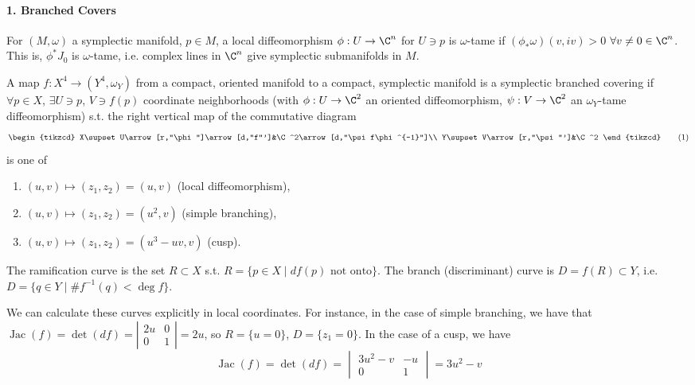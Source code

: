 \paragraph{1. Branched Covers}
\begin{definition}[1]
For $(M,\omega)$ a symplectic manifold, $p\in M$, a local diffeomorphism $\phi:U\to\C^n$ for $U\ni p$ is $\omega$-tame if $(\phi_*\omega)(v,iv)>0$ $\forall v\ne0\in\C^n$. This is, $\phi^*J_0$ is $\omega$-tame, i.e. complex lines in $\C^n$ give symplectic submanifolds in $M$.
\end{definition}
\begin{definition}[2]
A map $f:X^4\to(Y^4,\omega_Y)$ from a compact, oriented manifold to a compact, symplectic manifold is a symplectic branched covering if $\forall p\in X$, $\exists U\ni p$, $V\ni f(p)$ coordinate neighborhoods (with $\phi:U\to\C^2$ an oriented diffeomorphism, $\psi:V\to\C^2$ an $\omega_Y$-tame diffeomorphism) s.t. the right vertical map of the commutative diagram
\[
\begin{tikzcd}
X\supset U\arrow[r,"\phi"]\arrow[d,"f"']&\C^2\arrow[d,"\psi f\phi^{-1}"]\\
Y\supset V\arrow[r,"\psi"']&\C^2
\end{tikzcd}\tag{1}
\]
is one of
\begin{enumerate}
\item $(u,v)\mapsto(z_1,z_2)=(u,v)$ (local diffeomorphism),
\item $(u,v)\mapsto(z_1,z_2)=(u^2,v)$ (simple branching),
\item $(u,v)\mapsto(z_1,z_2)=(u^3-uv,v)$ (cusp).
\end{enumerate}
\end{definition}
\begin{definition}[3]
The ramification curve is the set $R\subset X$ s.t. $R=\{p\in X\mid df(p)\text{ not onto}\}$. The branch (discriminant) curve is $D=f(R)\subset Y$, i.e. $D=\{q\in Y\mid\#f^{-1}(q)<\deg f\}$.
\end{definition}
We can calculate these curves explicitly in local coordinates. For instance, in the case of simple branching, we have that $\operatorname{Jac}(f)=\det(df)=\left|\begin{smallmatrix}2u&0\\0&1\end{smallmatrix}\right|=2u$, so $R=\{u=0\}$, $D=\{z_1=0\}$. In the case of a cusp, we have
\[
\operatorname{Jac}(f)=\det(df)=\begin{vmatrix}3u^2-v&-u\\0&1\end{vmatrix}=3u^2-v\tag{2}
\]
